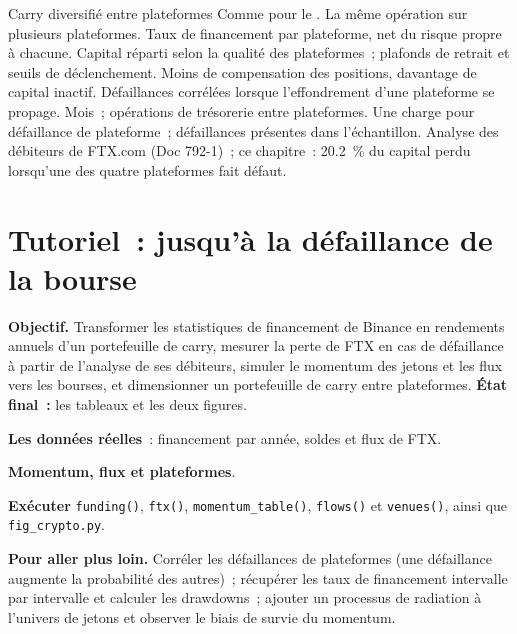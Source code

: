 \begin{strategyfile}{Carry diversifié entre plateformes}\label{strat:s1:crypto-medium-frequency-strategies:venue}
 Comme pour le .
 La même opération sur plusieurs plateformes.
 Taux de financement par plateforme, net du risque propre à chacune.
 Capital réparti selon la qualité des plateformes~; plafonds de retrait et seuils de déclenchement.
 Moins de compensation des positions, davantage de capital inactif.
 Défaillances corrélées lorsque l'effondrement d'une plateforme se propage.
 Mois~; opérations de trésorerie entre plateformes.
 Une charge pour défaillance de plateforme~; défaillances présentes dans l'échantillon.
 Analyse des débiteurs de FTX.com (Doc 792-1)~; ce chapitre~: 20.2~\% du capital perdu lorsqu'une des quatre plateformes fait défaut.
\end{strategyfile}

\section{Tutoriel~: jusqu'à la défaillance de la bourse}\label{tut:s1:crypto-medium-frequency-strategies:tut}

\begin{tutorial}
\textbf{Objectif.} Transformer les statistiques de financement de Binance en rendements annuels d'un portefeuille de carry, mesurer la perte de FTX en cas de défaillance à partir de l'analyse de ses débiteurs,
simuler le momentum des jetons et les flux vers les bourses, et dimensionner un portefeuille de carry entre plateformes. \textbf{État final~:} les tableaux et les deux figures.
\begin{tutsteps}
\item \textbf{Les données réelles}~: financement par année, soldes et flux de FTX.
\label{lst:s1:crypto-medium-frequency-strategies:data}
\item \textbf{Momentum, flux et plateformes}.
\label{lst:s1:crypto-medium-frequency-strategies:venues}
\item \textbf{Exécuter} \texttt{funding()}, \texttt{ftx()}, \texttt{momentum\_table()}, \texttt{flows()} et \texttt{venues()}, ainsi que \texttt{fig\_crypto.py}.
\end{tutsteps}
\textbf{Pour aller plus loin.} Corréler les défaillances de plateformes (une défaillance augmente la probabilité des autres)~; récupérer les taux de financement intervalle par intervalle et calculer
les drawdowns~; ajouter un processus de radiation à l'univers de jetons et observer le biais de survie du momentum.
\end{tutorial}

